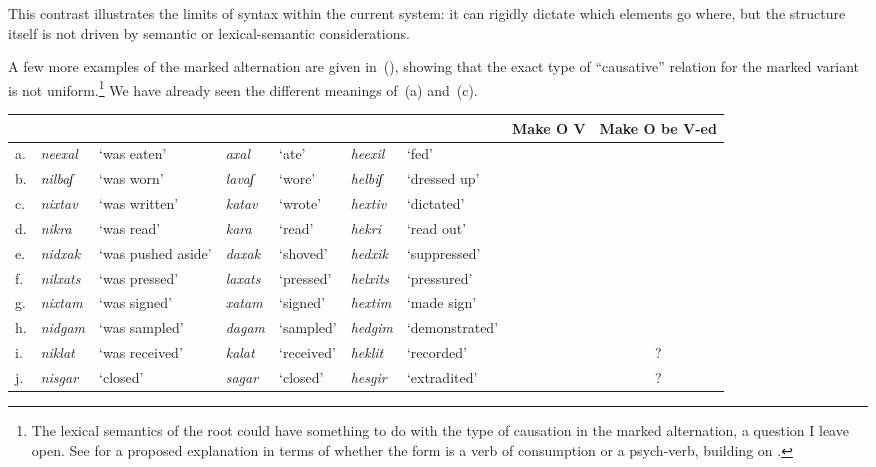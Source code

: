 This contrast illustrates the limits of syntax within the current system: it can rigidly dictate which elements go where, but the structure itself is not driven by semantic or lexical-semantic considerations.

A few more examples of the marked alternation are given in~(\nextx), showing that the exact type of ``causative'' relation for the marked variant is not uniform.\footnote{The lexical semantics of the root could have something to do with the type of causation in the marked alternation, a question I leave open. See \citet[44]{doron03} for a proposed explanation in terms of whether the {\tkal} form is a verb of consumption or a psych-verb, building on \cite{colesridhar77}.} We have already seen the different meanings of~(\nextx a) and~(\nextx c).
\ex\label{vd:ex:triplets-caus}
\xe
\begin{small}
\hspace{-4em}\begin{tabular}{l|ll|ll|llcc}
		\multicolumn{7}{c}{}		& Make O V	& Make O be V-ed\\\hline
		 a.& \emph{neexal}	& `was eaten'	& \emph{axal} & `ate'		& \emph{heexil} & `fed'			& \cmark	& \xmark\\
		 b.& \emph{nilbaʃ}	& `was worn'	& \emph{lavaʃ} & `wore' 	& \emph{helbiʃ}	&	`dressed up' 	& \cmark	& \xmark\\\hdashline
		 c.& \emph{nixtav} & `was written' & \emph{katav} & `wrote' & \emph{hextiv} & `dictated' & \xmark	& \cmark\\
		d.& \emph{nikra}	& `was read'	& \emph{kara} & `read'		& \emph{hekri}	& `read out'	& \xmark	& \cmark \\
		e.&	\emph{nidxak}	& `was pushed aside'	& \emph{daxak}	& `shoved'	& \emph{hedxik}	& `suppressed'\footnotemark	& \xmark	& \cmark\\
		f.& \emph{nilxats}	& `was pressed' &  \emph{laxats} & `pressed'	& \emph{helxits} & `pressured'	& \xmark	& \cmark \\\hdashline
		 g.& \emph{nixtam}	& `was signed'	& \emph{xatam} & `signed'	& \emph{hextim}	& `made sign'	& \cmark	& \cmark\\\hdashline
		h. & \emph{nidgam} & `was sampled'	& \emph{dagam} & `sampled'	& \emph{hedgim}		& `demonstrated'	& \xmark	& \xmark\\
		i. & \emph{niklat} & `was received' & \emph{kalat} & `received' & \emph{heklit} & `recorded' & \xmark & \cmark?\\
		j.& \emph{nisgar}	& `closed'	& \emph{sagar} & `closed'		& \emph{hesgir} & `extradited'	& \xmark	& \cmark?\\
		\end{tabular}
\end{small}

